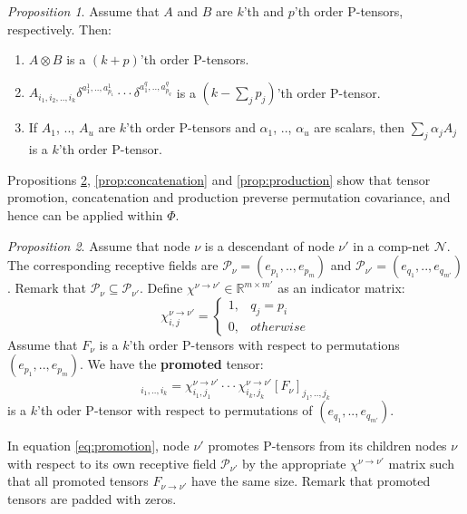 \documentclass[sigchi]{acmart}
\theoremstyle{definition}
\theoremstyle{theorem}
\theoremstyle{corollary}
\theoremstyle{lemma}
\theoremstyle{remark}
\theoremstyle{prop}
\newtheorem{prop}{Proposition}[section]
\begin{document}
\begin{prop}
Assume that $A$ and $B$ are $k$'th and $p$'th order P-tensors, respectively. Then:
\begin{enumerate}
\item $A \otimes B$ is a $(k + p)$'th order P-tensors.
\item $A_{i_1, i_2, .., i_k} \delta^{a_1^1, .., a_{p_1}^1} \cdot \cdot \cdot \delta^{a_1^q, .., a_{p_q}^q}$ is a $(k - \sum_j p_j)$'th order P-tensor.
\item If $A_1$, .., $A_u$ are $k$'th order P-tensors and $\alpha_1$, .., $\alpha_u$ are scalars, then $\sum_j \alpha_j A_j$ is a $k$'th order P-tensor.
\end{enumerate}
\label{prop:combination}
\end{prop}
Propositions \ref{prop:promotion}, \ref{prop:concatenation} and \ref{prop:production} show that tensor promotion, concatenation and production preverse permutation covariance, and hence can be applied within $\Phi$.
\begin{prop}
Assume that node $\nu$ is a descendant of node $\nu'$ in a comp-net $\mathcal{N}$. The corresponding receptive fields are $\mathcal{P}_\nu = (e_{p_1}, .., e_{p_m})$ and $\mathcal{P}_{\nu'} = (e_{q_1}, .., e_{q_{m'}})$. Remark that $\mathcal{P}_\nu \subseteq \mathcal{P}_{\nu'}$. Define $\chi^{\nu \rightarrow \nu'} \in \mathbb{R}^{m \times m'}$ as an indicator matrix:
\begin{equation}
\chi_{i, j}^{\nu \rightarrow \nu'} = \begin{cases} 1, & q_j = p_i \\ 0, & otherwise \end{cases}
\end{equation}
Assume that $F_\nu$ is a $k$'th order P-tensors with respect to permutations $(e_{p_1}, .., e_{p_m})$. We have the \textbf{promoted} tensor:
\begin{equation}
[F_{\nu \rightarrow \nu'}]_{i_1, .., i_k} = \chi_{i_1, j_1}^{\nu \rightarrow \nu'} \cdot \cdot \cdot \chi_{i_k, j_k}^{\nu \rightarrow \nu'} [F_\nu]_{j_1, .., j_k}
\label{eq:promotion}
\end{equation} 
is a $k$'th oder P-tensor with respect to permutations of $(e_{q_1}, .., e_{q_{m'}})$.
\label{prop:promotion}
\end{prop}
In equation \ref{eq:promotion}, node $\nu'$ promotes P-tensors from its children nodes $\nu$ with respect to its own receptive field $\mathcal{P}_{\nu'}$ by the appropriate $\chi^{\nu \rightarrow \nu'}$ matrix such that all promoted tensors $F_{\nu \rightarrow \nu'}$ have the same size. Remark that promoted tensors are padded with zeros.
\end{document}
